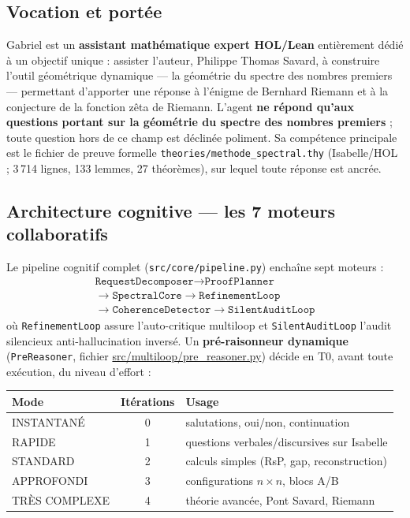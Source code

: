 \documentclass[11pt,a4paper]{article}
\begin{document}
\subsection{Vocation et portée}

Gabriel est un \textbf{assistant mathématique expert HOL/Lean} entièrement
dédié à un objectif unique : assister l'auteur, Philippe Thomas Savard, à
construire l'outil géométrique dynamique --- la géométrie du spectre des
nombres premiers --- permettant d'apporter une réponse à l'énigme de Bernhard
Riemann et à la conjecture de la fonction zêta de Riemann. L'agent
\textbf{ne répond qu'aux questions portant sur la géométrie du spectre des
nombres premiers} ; toute question hors de ce champ est déclinée poliment. Sa
compétence principale est le fichier de preuve formelle
\texttt{theories/methode\_spectral.thy} (Isabelle/HOL ; 3\,714 lignes,
133 lemmes, 27 théorèmes), sur lequel toute réponse est ancrée.

\subsection{Architecture cognitive --- les 7 moteurs collaboratifs}

Le pipeline cognitif complet (\texttt{src/core/pipeline.py}) enchaîne sept
moteurs :
\[
\begin{gathered}
\texttt{RequestDecomposer}\to\texttt{ProofPlanner}\\
\to\texttt{SpectralCore}\to\texttt{RefinementLoop}\\
\to\texttt{CoherenceDetector}\to\texttt{SilentAuditLoop}
\end{gathered}
\]
où \texttt{RefinementLoop} assure l'auto-critique multiloop et
\texttt{SilentAuditLoop} l'audit silencieux anti-hallucination inversé. Un
\textbf{pré-raisonneur dynamique} (\texttt{PreReasoner}, fichier
\url{src/multiloop/pre_reasoner.py})
décide en T0, avant toute exécution, du niveau d'effort :

\begin{center}\small
\begin{tabular}{@{}l c l@{}}
\toprule
\rowcolor{spectralgris}
Mode & Itérations & Usage \\
\midrule
INSTANTANÉ & 0 & salutations, oui/non, continuation \\
RAPIDE & 1 & questions verbales/discursives sur Isabelle \\
STANDARD & 2 & calculs simples (RsP, gap, reconstruction) \\
APPROFONDI & 3 & configurations $n \times n$, blocs A/B \\
TRÈS COMPLEXE & 4 & théorie avancée, Pont Savard, Riemann \\
\bottomrule
\end{tabular}
\end{center}
\end{document}
